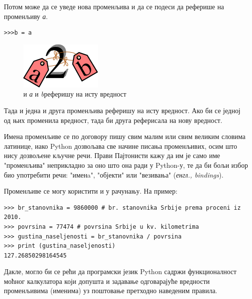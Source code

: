 Потом може да се уведе нова променљива и да се подеси да реферише на променљиву \emph{а}.

\begin{lstlisting}
>>>b = a
\end{lstlisting}

\begin{figure} [here]
\centering
\includegraphics{2ab.png}
\caption{и \emph{а} и \emph{b}реферишу на исту вредност}
\label{slike:a_b_je_2}
\end{figure}

Тада и једна и друга променљива реферишу на исту вредност. Ако би се једној од њих променила вредност, тада би друга реферисала на нову вредност.

Имена променљиве се по договору пишу свим малим или свим великим словима латинице, иако Python дозвољава све начине писања променљивих, осим што нису дозвољене кључне речи. Прави Пајтонисти\cite{pythonista} кажу да им је само име "променљива" неприкладно за оно што она ради у Python-у, те да би бољи избор био употребити речи: "именa",  "објекти" или "везивања" (\emph{енгл., bindings}).

Променљиве се могу користити и у рачунању. На пример:

\begin{lstlisting}[caption = Пример коришћења променљивих, label = variables]
>>> br_stanovnika = 9860000 # br. stanovnika Srbije prema proceni iz 2010.
>>> povrsina = 77474 # povrsina Srbije u kv. kilometrima
>>> gustina_naseljenosti = br_stanovnika / povrsina
>>> print (gustina_naseljenosti)
127.26850298164545
\end{lstlisting}

Дакле, могло би се рећи да програмски језик Python садржи функционалност моћног калкулатора који допушта и задавање одговарајуће вредности променљивима (именима) уз поштовање претходно наведеним правила.
